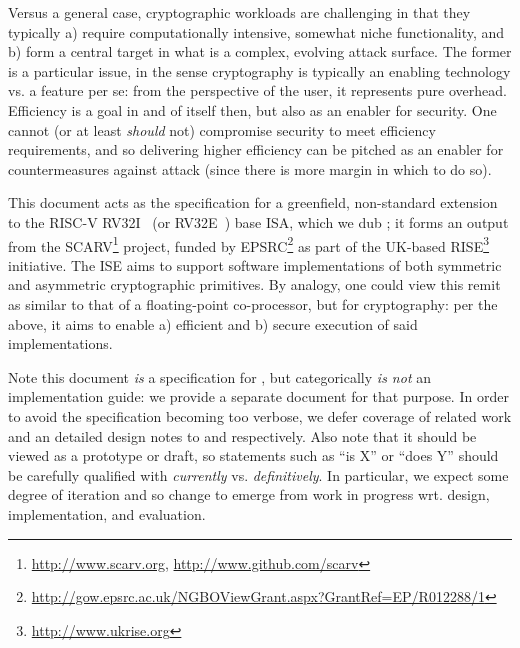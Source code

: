 
Versus a general case, cryptographic workloads are challenging in that they
typically
a) require computationally intensive, somewhat niche functionality,
   and
b) form a central target in what is a complex, evolving attack surface.
The former is a particular issue, in the sense cryptography is typically an
enabling technology vs. a feature per se: from the perspective of the user,
it represents pure overhead.  Efficiency is a goal in and of itself then, 
but also as an enabler for security.  One cannot (or at least {\em should} 
not) compromise security to meet efficiency requirements, and so delivering
higher efficiency can be pitched as an enabler for countermeasures against 
attack (since there is more margin in which to do so).

This document acts as the specification for a 
greenfield, non-standard extension~\cite[Section 21.1]{SCARV:RV:ISA:I:17} 
to the RISC-V 
RV32I~\cite[Section 2]{SCARV:RV:ISA:I:17} (or RV32E~\cite[Section 3]{SCARV:RV:ISA:I:17})
base ISA, which we dub \XCID; it forms an output from the SCARV\footnote{
\url{http://www.scarv.org}, \url{http://www.github.com/scarv}
} project, funded by EPSRC\footnote{
\url{http://gow.epsrc.ac.uk/NGBOViewGrant.aspx?GrantRef=EP/R012288/1}
} as part of the UK-based RISE\footnote{
\url{http://www.ukrise.org}
} initiative.
The \XCID ISE aims to support software implementations of both symmetric and 
asymmetric cryptographic primitives.  By analogy, one could view this remit
as similar to that of a floating-point co-processor, but for cryptography: 
per the above, it aims to enable
a) efficient
   and
b) secure
execution of said implementations.

Note this document {\em is} a specification for \XCID, but categorically
{\em is not} an implementation guide: we provide a separate document for 
that purpose.  In order to avoid the specification becoming too verbose,
we defer coverage of related work and an detailed design notes to
and
respectively.
Also note that it should be viewed as a prototype or draft, so statements 
such as 
``\XCID is   X'' 
or
``\XCID does Y''
should be carefully qualified with {\em currently} vs. {\em definitively}.  
In particular, we expect some degree of iteration and so change to emerge 
from work in progress wrt. design, implementation, and evaluation.


